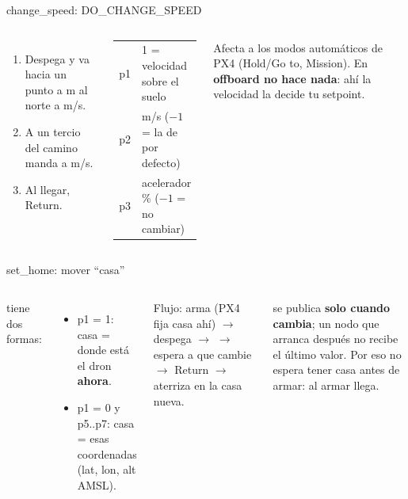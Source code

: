 \begin{frame}{change\_speed: DO\_CHANGE\_SPEED}
  \begin{columns}[c]
    \small
    \begin{enumerate}
      \item Despega y va hacia un punto a  m al norte a  m/s.
      \item A un tercio del camino manda  a  m/s.
      \item Al llegar, Return.
    \end{enumerate}
    \begin{center}\scriptsize
      \begin{tabular}{ll}
        \toprule
        p1 & 1 = velocidad sobre el suelo \\
        p2 & m/s ($-1$ = la de por defecto) \\
        p3 & acelerador \% ($-1$ = no cambiar) \\
        \bottomrule
      \end{tabular}
    \end{center}
    \begin{ojo}
      \small Afecta a los modos automáticos de PX4 (Hold/Go to, Mission). En \textbf{offboard no hace
      nada}: ahí la velocidad la decide tu setpoint.
    \end{ojo}
  \end{columns}
\end{frame}

\begin{frame}{set\_home: mover ``casa''}
  \begin{columns}[c]
    \small
     tiene dos formas:
    \begin{itemize}
      \item p1 = 1: casa = donde está el dron \textbf{ahora}.
      \item p1 = 0 y p5..p7: casa = esas coordenadas (lat, lon, alt AMSL).
    \end{itemize}
    Flujo: arma (PX4 fija casa ahí) $\rightarrow$ despega $\rightarrow$  $\rightarrow$
    espera a que  cambie $\rightarrow$ Return $\rightarrow$ aterriza en la
    casa nueva.
    \begin{ojo}
      \small {} se publica \textbf{solo cuando cambia}; un nodo que arranca después no
      recibe el último valor. Por eso  no espera tener casa antes de armar: al armar llega.
    \end{ojo}
  \end{columns}
\end{frame}

